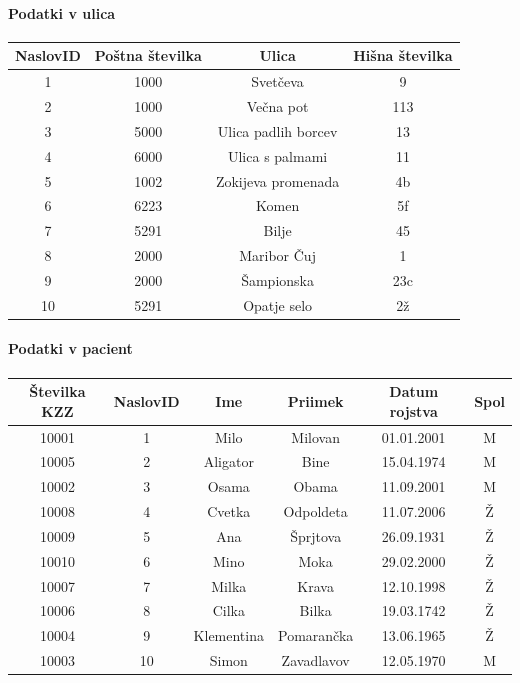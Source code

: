 \documentclass[a4paper,11pt]{report}
\begin{document}
\pagebreak
\paragraph{Podatki v ulica}\mbox{}

\begin{tabular}{||c|c|c|c||}
    \hline
    NaslovID&Poštna številka&Ulica&Hišna številka\\
    \hline\hline
        1&1000&Svetčeva&9 \\
        2&1000&Večna pot&113 \\
        3&5000&Ulica padlih borcev&13 \\
        4&6000&Ulica s palmami&11 \\
        5&1002&Zokijeva promenada&4b \\
        6&6223&Komen&5f \\
        7&5291&Bilje&45 \\
        8&2000&Maribor Čuj&1 \\
        9&2000&Šampionska&23c \\
        10&5291&Opatje selo&2ž \\
    \hline
\end{tabular}

\paragraph{Podatki v pacient}\mbox{}

\begin{tabular}{||c|c|c|c|c|c||}
    \hline
    Številka KZZ&NaslovID&Ime&Priimek&Datum rojstva&Spol\\
    \hline\hline
        10001&1&Milo&Milovan&01.01.2001&M\\
        10005&2&Aligator&Bine&15.04.1974&M\\
        10002&3&Osama&Obama&11.09.2001&M\\
        10008&4&Cvetka&Odpoldeta&11.07.2006&Ž\\
        10009&5&Ana&Šprjtova&26.09.1931&Ž\\
        10010&6&Mino&Moka&29.02.2000&Ž\\
        10007&7&Milka&Krava&12.10.1998&Ž\\
        10006&8&Cilka&Bilka&19.03.1742&Ž\\
        10004&9&Klementina&Pomarančka&13.06.1965&Ž\\
        10003&10&Simon&Zavadlavov&12.05.1970&M\\
    \hline
\end{tabular}
\end{document}
